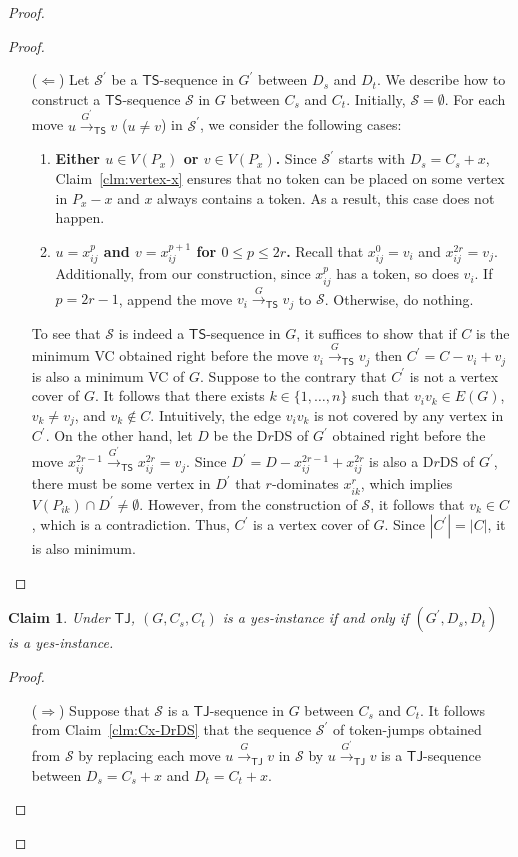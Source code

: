 \documentclass[a4paper]{article}
\theoremstyle{plain}
\newtheorem{claim}{Claim}[theorem]
\theoremstyle{definition}
\newcommand{\sfTS}{{\mathsf{TS}}} %
\newcommand{\sfTJ}{{\mathsf{TJ}}} %
\newcommand{\sfR}{{\mathsf{R}}} %
\newcommand{\calS}{{\mathcal{S}}}
\newcommand{\reconf}[2][\sfR]{\overset{#2}{\longrightarrow}_{#1}} %
\begin{document}
\begin{proof}
\begin{proof}
\begin{itemize}
			\item[($\Leftarrow$)] Let $\calS^\prime$ be a $\sfTS$-sequence in $G^\prime$ between $D_s$ and $D_t$.
			We describe how to construct a $\sfTS$-sequence $\calS$ in $G$ between $C_s$ and $C_t$.
			Initially, $\calS = \emptyset$.
			For each move $u \reconf[\sfTS]{G^\prime} v$ ($u \neq v$) in $\calS^\prime$, we consider the following cases:
			\begin{enumerate}[{\bf {Case} 1:}]
				\item {\bf Either $u \in V(P_x)$ or $v \in V(P_x)$.} 
				Since $\calS^\prime$ starts with $D_s = C_s + x$, Claim~\ref{clm:vertex-x} ensures that no token can be placed on some vertex in $P_x - x$ and $x$ always contains a token.
				As a result, this case does not happen.
				
				\item {\bf $u = x_{ij}^p$ and $v = x_{ij}^{p+1}$ for $0 \leq p \leq 2r$.} Recall that $x_{ij}^0 = v_i$ and $x_{ij}^{2r} = v_j$. 
				Additionally, from our construction, since $x_{ij}^p$ has a token, so does $v_i$.
				If $p = 2r-1$, append the move $v_i \reconf[\sfTS]{G} v_j$ to $\calS$.
				Otherwise, do nothing.
			\end{enumerate}
			To see that $\calS$ is indeed a $\sfTS$-sequence in $G$, it suffices to show that if $C$ is the minimum VC obtained right before the move $v_i \reconf[\sfTS]{G} v_j$ then $C^\prime = C - v_i + v_j$ is also a minimum VC of $G$.
			Suppose to the contrary that $C^\prime$ is not a vertex cover of $G$.
			It follows that there exists $k \in \{1, \dots, n\}$ such that $v_iv_k \in E(G)$, $v_k \neq v_j$, and $v_k \notin C$.
			Intuitively, the edge $v_iv_k$ is not covered by any vertex in $C^\prime$.
			On the other hand, let $D$ be the D$r$DS of $G^\prime$ obtained right before the move $x_{ij}^{2r-1} \reconf[\sfTS]{G^\prime} x_{ij}^{2r} = v_j$.
			Since $D^\prime = D - x_{ij}^{2r-1} + x_{ij}^{2r}$ is also a D$r$DS of $G^\prime$, there must be some vertex in $D^\prime$ that $r$-dominates $x_{ik}^r$, which implies $V(P_{ik}) \cap D^\prime \neq \emptyset$.
			However, from the construction of $\calS$, it follows that $v_k \in C$, which is a contradiction.
			Thus, $C^\prime$ is a vertex cover of $G$.
			Since $|C^\prime| = |C|$, it is also minimum.
		\end{itemize}
	\end{proof}
	
	\begin{claim}\label{clm:TJ-bipartite} %
		Under $\sfTJ$, $(G, C_s, C_t)$  is a yes-instance if and only if $(G^\prime, D_s, D_t)$ is a yes-instance.
	\end{claim}
	\begin{proof}
		\begin{itemize}
			\item[($\Rightarrow$)] Suppose that $\calS$ is a $\sfTJ$-sequence in $G$ between $C_s$ and $C_t$.
			It follows from Claim~\ref{clm:Cx-DrDS} that the sequence $\calS^\prime$ of token-jumps obtained from $\calS$ by replacing each move $u \reconf[\sfTJ]{G} v$ in $\calS$ by $u \reconf[\sfTJ]{G^\prime} v$ is a $\sfTJ$-sequence between $D_s = C_s + x$ and $D_t = C_t + x$.
			

\end{itemize}
\end{proof}
\end{proof}
\end{document}
